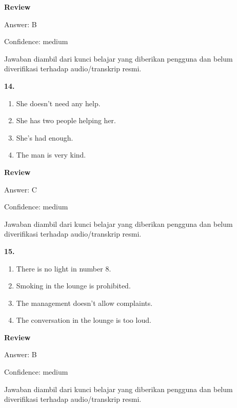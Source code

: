 \documentclass[12pt]{article}
\begin{document}
\par
\begingroup
\setlength{\parskip}{0pt}
\setlength{\parindent}{0pt}
\textbf{Review}\par
Answer: B\par
Confidence: medium\par
Jawaban diambil dari kunci belajar yang diberikan pengguna dan belum diverifikasi terhadap audio/transkrip resmi.\par
\endgroup
\par
\vspace{0.25\baselineskip}
\noindent\textbf{14.}
\begin{enumerate}[label=(\Alph*),leftmargin=*,itemsep=0.2em]
\item She doesn't need any help.
\item She has two people helping her.
\item She's had enough.
\item The man is very kind.
\end{enumerate}
\par
\begingroup
\setlength{\parskip}{0pt}
\setlength{\parindent}{0pt}
\textbf{Review}\par
Answer: C\par
Confidence: medium\par
Jawaban diambil dari kunci belajar yang diberikan pengguna dan belum diverifikasi terhadap audio/transkrip resmi.\par
\endgroup
\par
\vspace{0.25\baselineskip}
\noindent\textbf{15.}
\begin{enumerate}[label=(\Alph*),leftmargin=*,itemsep=0.2em]
\item There is no light in number 8.
\item Smoking in the lounge is prohibited.
\item The management doesn't allow complaints.
\item The conversation in the lounge is too loud.
\end{enumerate}
\par
\begingroup
\setlength{\parskip}{0pt}
\setlength{\parindent}{0pt}
\textbf{Review}\par
Answer: B\par
Confidence: medium\par
Jawaban diambil dari kunci belajar yang diberikan pengguna dan belum diverifikasi terhadap audio/transkrip resmi.\par
\endgroup
\par
\end{document}
